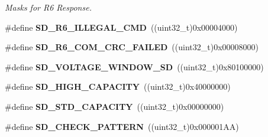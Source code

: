 \begin{DoxyCompactItemize}
\begin{DoxyCompactList}\small\item\em Masks for R6 Response. \end{DoxyCompactList}\item 
\#define {\bfseries S\+D\+\_\+\+R6\+\_\+\+I\+L\+L\+E\+G\+A\+L\+\_\+\+C\+MD}~((uint32\+\_\+t)0x00004000)\hypertarget{group___s_t_m324x_g___e_v_a_l___s_d_i_o___s_d___private___defines_ga4f58bfcb28f68b87113fea12b172a247}{}\label{group___s_t_m324x_g___e_v_a_l___s_d_i_o___s_d___private___defines_ga4f58bfcb28f68b87113fea12b172a247}

\item 
\#define {\bfseries S\+D\+\_\+\+R6\+\_\+\+C\+O\+M\+\_\+\+C\+R\+C\+\_\+\+F\+A\+I\+L\+ED}~((uint32\+\_\+t)0x00008000)\hypertarget{group___s_t_m324x_g___e_v_a_l___s_d_i_o___s_d___private___defines_gad4677c73c4e8e7e1ec2161554cfdfeeb}{}\label{group___s_t_m324x_g___e_v_a_l___s_d_i_o___s_d___private___defines_gad4677c73c4e8e7e1ec2161554cfdfeeb}

\item 
\#define {\bfseries S\+D\+\_\+\+V\+O\+L\+T\+A\+G\+E\+\_\+\+W\+I\+N\+D\+O\+W\+\_\+\+SD}~((uint32\+\_\+t)0x80100000)\hypertarget{group___s_t_m324x_g___e_v_a_l___s_d_i_o___s_d___private___defines_ga0c04dbb0a43806365bea64893961079e}{}\label{group___s_t_m324x_g___e_v_a_l___s_d_i_o___s_d___private___defines_ga0c04dbb0a43806365bea64893961079e}

\item 
\#define {\bfseries S\+D\+\_\+\+H\+I\+G\+H\+\_\+\+C\+A\+P\+A\+C\+I\+TY}~((uint32\+\_\+t)0x40000000)\hypertarget{group___s_t_m324x_g___e_v_a_l___s_d_i_o___s_d___private___defines_gad5a86eaeba6869b6b2139b92ddfb3a1f}{}\label{group___s_t_m324x_g___e_v_a_l___s_d_i_o___s_d___private___defines_gad5a86eaeba6869b6b2139b92ddfb3a1f}

\item 
\#define {\bfseries S\+D\+\_\+\+S\+T\+D\+\_\+\+C\+A\+P\+A\+C\+I\+TY}~((uint32\+\_\+t)0x00000000)\hypertarget{group___s_t_m324x_g___e_v_a_l___s_d_i_o___s_d___private___defines_ga3cb5fdbf46102857a99b044415873f14}{}\label{group___s_t_m324x_g___e_v_a_l___s_d_i_o___s_d___private___defines_ga3cb5fdbf46102857a99b044415873f14}

\item 
\#define {\bfseries S\+D\+\_\+\+C\+H\+E\+C\+K\+\_\+\+P\+A\+T\+T\+E\+RN}~((uint32\+\_\+t)0x000001\+A\+A)\hypertarget{group___s_t_m324x_g___e_v_a_l___s_d_i_o___s_d___private___defines_gac37389a0323f1a04aec2b59c905f0f6a}{}\label{group___s_t_m324x_g___e_v_a_l___s_d_i_o___s_d___private___defines_gac37389a0323f1a04aec2b59c905f0f6a}


\end{DoxyCompactItemize}
